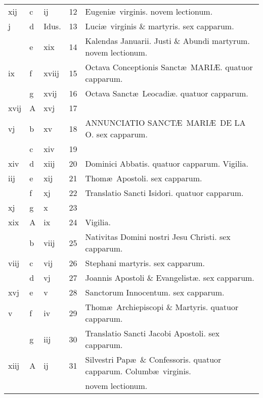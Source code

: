 \documentclass[letter,11pt]{book}
\begin{document}
\begin{center}
\begin{tabular}{l | l | l | r | l}
\color{Red} xij & c & \color{Red} ij & 12 & Eugeni\ae \ virginis. \color{Red} novem lectionum. \\
\color{Red} j & d & Idus. & 13 & Luci\ae \ virginis \& martyris. \color{Red} sex capparum. \\
\color{Red}  & e & \color{Red} xix & 14 & \color{Red} Kalendas Januarii. \color{black} Justi \& Abundi martyrum. \color{Red} novem lectionum. \\
\color{Red} ix & f & \color{Red} xviij & 15 & Octava Conceptionis Sanct\ae \ MARI\AE . \color{Red} quatuor capparum. \\
\color{Red}  & g & \color{Red} xvij & 16 & Octava Sanct\ae \ Leocadi\ae . \color{Red} quatuor capparum. \\
\color{Red} xvij & \color{Red} A & \color{Red} xvj & 17 & \\
\color{Red} vj & b & \color{Red} xv & 18 & \color{Red} ANNUNCIATIO SANCT\AE \ MARI\AE \ DE LA O. \color{black} sex capparum. \\
\color{Red}  & c & \color{Red} xiv & 19 & \\
\color{Red} xiv & d & \color{Red} xiij & 20 & Dominici Abbatis. \color{Red} quatuor capparum. \color{black} Vigilia. \\
\color{Red} iij & e & \color{Red} xij & 21 & \color{Red} Thom\ae \ Apostoli. \color{black} sex capparum. \\
\color{Red}  & f & \color{Red} xj & 22 & Translatio Sancti Isidori. \color{Red} quatuor capparum. \\
\color{Red} xj & g & \color{Red} x & 23 & \\
\color{Red} xix & \color{Red} A & \color{Red} ix & 24 & \qquad Vigilia. \\
\color{Red}  & b & \color{Red} viij & 25 & \color{Red} Nativitas Domini nostri Jesu Christi. \color{black} sex capparum. \\
\color{Red} viij & c & \color{Red} vij & 26 & \color{Red} Stephani martyris. \color{black} sex capparum. \\
\color{Red}  & d & \color{Red} vj & 27 & \color{Red} Joannis Apostoli \& Evangelist\ae . \color{black} sex capparum. \\
\color{Red} xvj & e & \color{Red} v & 28 & \color{Red} Sanctorum Innocentum. \color{black} sex capparum. \\
\color{Red} v & f & \color{Red} iv & 29 & Thom\ae \ Archiepiscopi \& Martyris. \color{Red} quatuor capparum. \\
\color{Red}  & g & \color{Red} iij & 30 & Translatio Sancti Jacobi Apostoli. \color{Red} sex capparum. \\
\color{Red} xiij & \color{Red} A & \color{Red} ij & 31 & Silvestri Pap\ae \ \& Confessoris. \color{Red} quatuor capparum. \color{black} Columb\ae \ virginis. \\
 &  &  &  & \quad \color{Red} novem lectionum. \\
\end{tabular}
\end{center}
\end{document}
